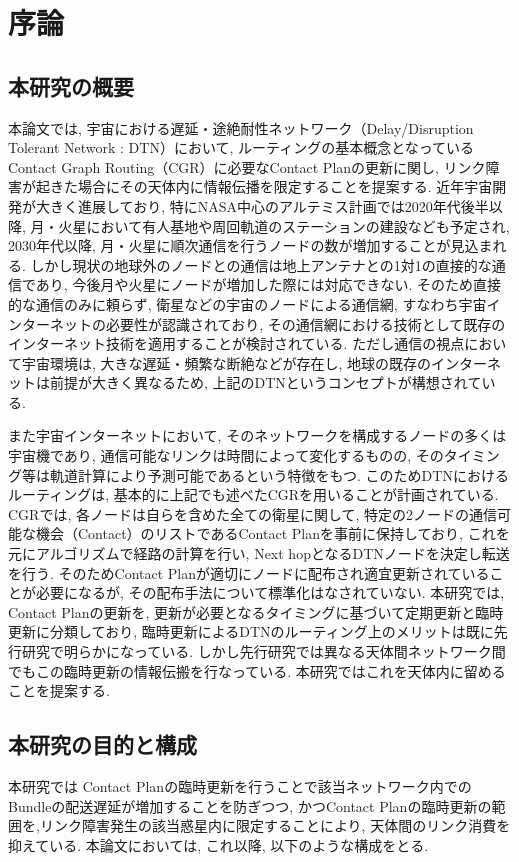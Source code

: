\chapter{序論}

\section{本研究の概要}
本論文では, 宇宙における遅延・途絶耐性ネットワーク（Delay/Disruption Tolerant Network : DTN）において, 
ルーティングの基本概念となっているContact Graph Routing（CGR）に必要なContact Planの更新に関し, 
リンク障害が起きた場合にその天体内に情報伝播を限定することを提案する. 
近年宇宙開発が大きく進展しており, 特にNASA中心のアルテミス計画では2020年代後半以降, 
月・火星において有人基地や周回軌道のステーションの建設なども予定され, 
2030年代以降, 月・火星に順次通信を行うノードの数が増加することが見込まれる. 
しかし現状の地球外のノードとの通信は地上アンテナとの1対1の直接的な通信であり, 
今後月や火星にノードが増加した際には対応できない. そのため直接的な通信のみに頼らず, 
衛星などの宇宙のノードによる通信網, すなわち宇宙インターネットの必要性が認識されており, 
その通信網における技術として既存のインターネット技術を適用することが検討されている. 
ただし通信の視点において宇宙環境は, 大きな遅延・頻繁な断絶などが存在し, 
地球の既存のインターネットは前提が大きく異なるため, 
上記のDTNというコンセプトが構想されている. 

また宇宙インターネットにおいて, そのネットワークを構成するノードの多くは宇宙機であり, 
通信可能なリンクは時間によって変化するものの, そのタイミング等は軌道計算により予測可能であるという特徴をもつ. 
このためDTNにおけるルーティングは, 基本的に上記でも述べたCGRを用いることが計画されている. 
CGRでは, 各ノードは自らを含めた全ての衛星に関して, 
特定の2ノードの通信可能な機会（Contact）のリストであるContact Planを事前に保持しており, 
これを元にアルゴリズムで経路の計算を行い, Next hopとなるDTNノードを決定し転送を行う. 
そのためContact Planが適切にノードに配布され適宜更新されていることが必要になるが, 
その配布手法について標準化はなされていない. 本研究では, Contact Planの更新を, 
更新が必要となるタイミングに基づいて定期更新と臨時更新に分類しており, 
臨時更新によるDTNのルーティング上のメリットは既に先行研究で明らかになっている. 
しかし先行研究では異なる天体間ネットワーク間でもこの臨時更新の情報伝搬を行なっている. 
本研究ではこれを天体内に留めることを提案する. 

\section{本研究の目的と構成}
本研究では
Contact Planの臨時更新を行うことで該当ネットワーク内でのBundleの配送遅延が増加することを防ぎつつ, 
かつContact Planの臨時更新の範囲を,リンク障害発生の該当惑星内に限定することにより, 
天体間のリンク消費を抑えている. 
本論文においては, これ以降, 以下のような構成をとる. 

